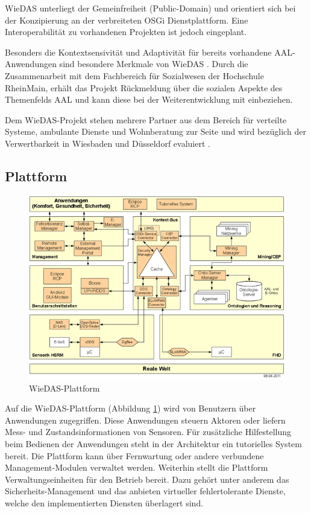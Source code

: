 WieDAS unterliegt der Gemeinfreiheit (Public-Domain) und orientiert sich bei der Konzipierung an der
verbreiteten OSGi Dienstplattform.
Eine Interoperabilität zu vorhandenen Projekten ist jedoch eingeplant.

Besonders die Kontextsensivität und Adaptivität für bereits vorhandene AAL-Anwendungen sind besondere
Merkmale von WieDAS \cite{wiedas}.
Durch die Zusammenarbeit mit dem Fachbereich für Sozialwesen der Hochschule RheinMain, erhält das Projekt
Rückmeldung über die sozialen Aspekte des Themenfelds AAL und kann diese bei der Weiterentwicklung mit
einbeziehen.

Dem WieDAS-Projekt stehen mehrere Partner aus dem Bereich für verteilte Systeme, ambulante Dienste und
Wohnberatung zur Seite und wird bezüglich der Verwertbarkeit in Wiesbaden und Düsseldorf evaluiert \cite[Partner]{wiedas}.

\subsection{Plattform}
\label{gru_wiedas_plattform}

\begin{figure}[h]
\includegraphics[scale=0.8]{images/wiedas_plattform}
\caption{WieDAS-Plattform}
\label{abb_wiedas_plattform}
\end{figure}

Auf die WieDAS-Plattform (Abbildung \ref{abb_wiedas_plattform}) wird von Benutzern über Anwendungen zugegriffen.
Diese Anwendungen steuern Aktoren oder liefern Mess- und Zustandsinformationen von Sensoren.
Für zusätzliche Hilfestellung beim Bedienen der Anwendungen steht in der Architektur ein
tutorielles System bereit.
Die Plattform kann über Fernwartung oder andere verbundene Management-Modulen verwaltet werden.
Weiterhin stellt die Plattform Verwaltungseinheiten für den Betrieb bereit.
Dazu gehört unter anderem das Sicherheits-Management und das anbieten virtueller fehlertolerante
Dienste, welche den implementierten Diensten überlagert sind.

